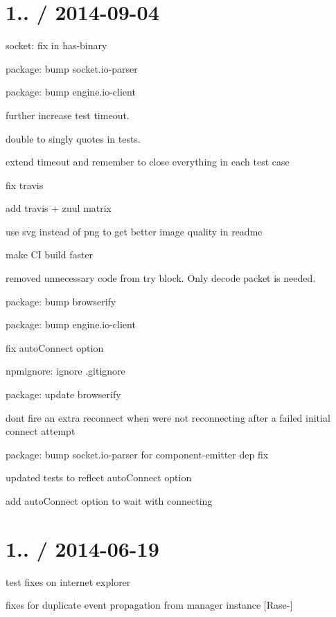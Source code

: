\section*{1.. / 2014-\/09-\/04 }


\begin{DoxyItemize}
\item socket\+: fix in {\ttfamily has-\/binary}
\item package\+: bump {\ttfamily socket.\+io-\/parser}
\item package\+: bump {\ttfamily engine.\+io-\/client}
\item further increase test timeout.
\item double to singly quotes in tests.
\item extend timeout and remember to close everything in each test case
\item fix travis
\item add travis + zuul matrix
\item use svg instead of png to get better image quality in readme
\item make CI build faster
\item removed unnecessary code from try block. Only decode packet is needed.
\item package\+: bump {\ttfamily browserify}
\item package\+: bump {\ttfamily engine.\+io-\/client}
\item fix auto\+Connect option
\item npmignore\+: ignore {\ttfamily .gitignore}
\item package\+: update {\ttfamily browserify}
\item don\textquotesingle{}t fire an extra reconnect when we\textquotesingle{}re not reconnecting after a failed initial connect attempt
\item package\+: bump {\ttfamily socket.\+io-\/parser} for {\ttfamily component-\/emitter} dep fix
\item updated tests to reflect {\ttfamily auto\+Connect} option
\item add {\ttfamily auto\+Connect} option to wait with connecting
\end{DoxyItemize}

\section*{1.. / 2014-\/06-\/19 }


\begin{DoxyItemize}
\item test fixes on internet explorer
\item fixes for duplicate event propagation from manager instance \mbox{[}Rase-\/\mbox{]}
\end{DoxyItemize}

